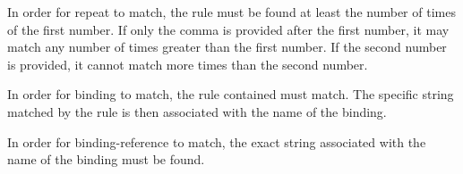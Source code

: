 In order for repeat to match, the rule must be found at least the number of times of the first number. If only the comma is provided after the first number, it may match any number of times greater than the first number. If the second number is provided, it cannot match more times than the second number.

In order for binding to match, the rule contained must match. The specific string matched by the rule is then associated with the name of the binding.

In order for binding-reference to match, the exact string associated with the name of the binding must be found.

